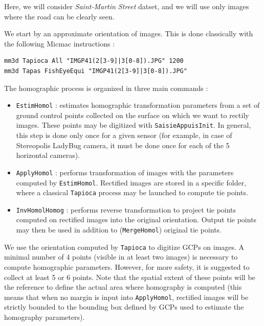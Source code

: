 \noindent Here, we will consider \textit{Saint-Martin Street} datset, and we will use only images where the road can be clearly seen. \newline

\noindent We start by an approximate orientation of images. This is done classically with the following Micmac instructions : \newline

\begin{verbatim}
mm3d Tapioca All "IMGP41(2[3-9]|3[0-8]).JPG" 1200
mm3d Tapas FishEyeEqui "IMGP41(2[3-9]|3[0-8]).JPG"
\end{verbatim}

\noindent The homographic process is organized in three main commands : \newline
\begin{itemize}
	\item \texttt{EstimHomol} : estimates homographic transformation parameters from a set of ground control points collected on the surface on which we want to rectily images. These points may be digitized with \texttt{SaisieAppuisInit}. In general, this step is done only once for a given sensor (for example, in case of Stereopolis LadyBug camera, it must be done once for each of the 5 horizontal cameras).  \newline 	
	\item \texttt{ApplyHomol} : performs transformation of images with the parameters computed by \texttt{EstimHomol}. Rectified images are stored in a specific folder, where a classical \texttt{Tapioca} process may be launched to compute tie points.   \newline 
	\item \texttt{InvHomolHomog} : performs reverse transformation to project tie points computed on rectified images into the original orientation. Output tie points may then be used in addition to (\texttt{MergeHomol}) original tie points.   \newline 
\end{itemize}

\noindent We use the orientation computed by \texttt{Tapioca} to digitize GCPs on images. A minimal number of 4 points (visible in at least two images) is necessary to compute homographic parameters. However, for more safety, it is suggested to collect at least 5 or 6 points. Note that the spatial extent of these points will be the reference to define the actual area where homography is computed (this means that when no margin is input into \texttt{ApplyHomol}, rectified images will be strictly bounded to the bounding box defined by GCPs used to estimate the homography parameters). \newline

